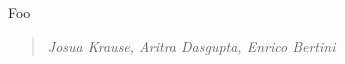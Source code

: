 
\begin{contributions}{Foo}
\item {}
\end{contributions}

\begin{quote}
\textit{Josua Krause, Aritra Dasgupta, Enrico Bertini}
\end{quote}
